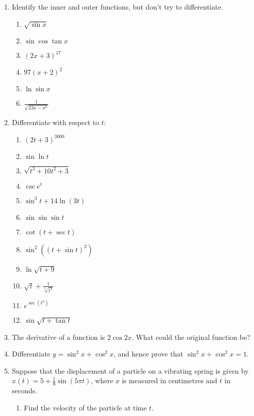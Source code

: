 \begin{enumerate}
  \item Identify the inner and outer functions, but don't try to differentiate.
    \begin{enumerate}
      \item $ \sqrt{\sin x} $
      \item $ \sin \cos \tan x $
      \item $ (2x + 3)^{17} $
      \item $ 97(x + 2)^2 $
      \item $ \ln \sin x $
      \item $ \frac{1}{\sqrt{23x - x^2}} $
    \end{enumerate}
  \item Differentiate with respect to $ t $:
    \begin{multicols}{2}
    \begin{enumerate}
      \item $ (2t + 3)^{3000} $
      \item $ \sin \ln t $
      \item $ \sqrt{t^3 + 10t^2 + 3} $
      \item $ \csc e^t $
      \item $ \sin^3 t + 14\ln (3t) $
      \item $ \sin \sin \sin t $
      \item $ \cot (t + \sec t) $
      \item $ \sin^2 ((t + \sin t)^2) $
      \item $ \ln \sqrt{t + 9} $
      \item $ \sqrt{t} + \frac{1}{\sqrt[3]{t^4}} $
      \item $ e^{\sec (t^2)} $
      \item $ \sin \sqrt{t + \tan t} $
    \end{enumerate}
    \end{multicols}
  \item The derivative of a function is $ 2 \cos 2x $. What could the original function be?
  \item Differentiate $ y = \sin^2 x + \cos^2 x $, and hence prove that $ \sin^2 x + \cos^2 x = 1 $.
  \item Suppose that the displacement of a particle on a vibrating spring is given by $ x(t) =  5 + \frac{1}{8} \sin(5\pi t) $,
        where $ x $ is measured in centimetres and $ t $ in seconds.
    \begin{enumerate}
      \item Find the velocity of the particle at time $ t $.

\end{enumerate}
\end{enumerate}
